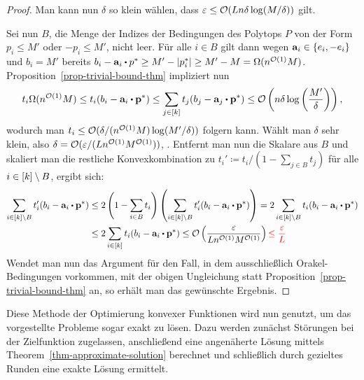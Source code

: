 \begin{proof}
	Man kann nun $\delta$ so klein wählen, dass $\varepsilon\leq\mathcal{O}(Ln\delta\log(M/\delta))$ gilt.
	
	Sei nun $B$, die Menge der Indizes der Bedingungen des Polytops $P$ von der Form $p_i \leq M'$ oder $-p_i \leq M'$, nicht leer.
	Für alle $i\in B$ gilt dann wegen $\mathbf{a}_i\in\{e_i, -e_i \}$ und $b_i=M'$ bereits $b_i - \fa_i\bcdot p^* \geq M' - \abs{p^*_i} \geq M' - M = \Omega(n^{\bigO(1)}M)$.
	Proposition~\ref{prop-trivial-bound-thm} impliziert nun
\[ 
	t_i \Omega(n^{\bigO(1)} M)
	\leq t_i (b_i - \fa_i \bcdot \fp^*)
	\leq \sum_{j\in\first{k}} t_j (b_j - \fa_j \bcdot \fp^*)
	\leq \bigO\left(  n\delta\log\left( \frac{M'}{\delta}  \right) \right),
\]
	wodurch man $t_i\leq \mathcal{O}(\delta / (n^{\mathcal{O}(1)} M)  \log(M'/\delta))$ folgern kann.
	Wählt man $\delta$ sehr klein, also $\delta=\mathcal{O}(\varepsilon/(Ln^{\mathcal{O}(1)} M^{\mathcal{O}(1)} ))$, .
	Entfernt man nun die Skalare aus $B$ und skaliert man die restliche Konvexkombination zu $t_i'\coloneqq t_i / (1 - \sum_{j\in B} t_j)$ für alle $i\in\left[ k \right]\setminus B$, ergibt sich:
	\begin{align*}
		\sum_{i\in \first{k}\setminus B} t_i'(b_i - \fa_i \bcdot \fp^*)
		&\leq 2 \left( 1-\sum_{i\in B}t_i  \right) \left( \sum_{i\in \first{k}\setminus B} t_i' (b_i - \fa_i \bcdot \fp^*) \right)
		= 2 \sum_{i\in \first{k}\setminus B} t_i (b_i - \fa_i \bcdot \fp^*)\\
		&\leq 2\sum_{i\in\first{k}} t_i(b_i - \fa_i\bcdot \fp^*)
		\leq \bigO\left(\frac{\varepsilon}{Ln^{\bigO(1)}M^{\bigO(1)}}\right)
		\todo{\leq \frac{\varepsilon}{L}}
	\end{align*}
	Wendet man nun das Argument für den Fall, in dem ausschließlich Orakel-Bedingungen vorkommen, mit der obigen Ungleichung statt Proposition~\ref{prop-trivial-bound-thm} an, so erhält man das gewünschte Ergebnis.
\end{proof}

Diese Methode der Optimierung konvexer Funktionen wird nun genutzt, um das vorgestellte Probleme sogar exakt zu lösen.
Dazu werden zunächst Störungen bei der Zielfunktion zugelassen, anschließend eine angenäherte Lösung mittels Theorem~\ref{thm-approximate-solution} berechnet und schließlich durch gezieltes Runden eine exakte Lösung ermittelt.

